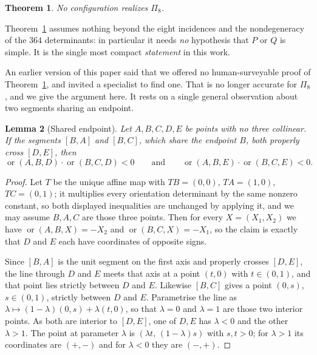 \documentclass[11pt,a4paper]{article}
\theoremstyle{plain}
\newtheorem{theorem}{Theorem}[section]
\newtheorem{lemma}[theorem]{Lemma}
\theoremstyle{definition}
\theoremstyle{remark}
\newcommand{\orient}{\operatorname{or}}
\begin{document}
\begin{theorem}\label{thm:pat8}
No configuration realizes $\Pi_8$.
\end{theorem}

Theorem~\ref{thm:pat8} assumes nothing beyond the eight incidences and the
nondegeneracy of the $364$ determinants: in particular it needs \emph{no}
hypothesis that $P$ or $Q$ is simple. It is the single most compact
\emph{statement} in this work.

An earlier version of this paper said that we offered no human-surveyable
proof of Theorem~\ref{thm:pat8}, and invited a specialist to find one. That is
no longer accurate for $\Pi_8$, and we give the argument here. It rests on a
single general observation about two segments sharing an endpoint.

\begin{lemma}[Shared endpoint]\label{lem:shared}
Let $A,B,C,D,E$ be points with no three collinear. If the segments $[B,A]$ and
$[B,C]$, which share the endpoint $B$, \emph{both} properly cross $[D,E]$, then
\[
  \orient(A,B,D)\cdot\orient(B,C,D) < 0
  \qquad\text{and}\qquad
  \orient(A,B,E)\cdot\orient(B,C,E) < 0 .
\]
\end{lemma}

\begin{proof}
Let $T$ be the unique affine map with $TB=(0,0)$, $TA=(1,0)$, $TC=(0,1)$; it
multiplies every orientation determinant by the same nonzero constant, so both
displayed inequalities are unchanged by applying it, and we may assume
$B,A,C$ are those three points. Then for every $X=(X_1,X_2)$ we have
$\orient(A,B,X)=-X_2$ and $\orient(B,C,X)=-X_1$, so the claim is exactly that
$D$ and $E$ each have coordinates of opposite signs.

Since $[B,A]$ is the unit segment on the first axis and properly crosses
$[D,E]$, the line through $D$ and $E$ meets that axis at a point $(t,0)$ with
$t\in(0,1)$, and that point lies strictly between $D$ and $E$. Likewise
$[B,C]$ gives a point $(0,s)$, $s\in(0,1)$, strictly between $D$ and $E$.
Parametrise the line as $\lambda\mapsto(1-\lambda)(0,s)+\lambda(t,0)$, so that
$\lambda=0$ and $\lambda=1$ are those two interior points. As both are interior
to $[D,E]$, one of $D,E$ has $\lambda<0$ and the other $\lambda>1$. The point
at parameter $\lambda$ is $(\lambda t,\,(1-\lambda)s)$ with $s,t>0$; for
$\lambda>1$ its coordinates are $(+,-)$ and for $\lambda<0$ they are $(-,+)$.
\end{proof}
\end{document}
